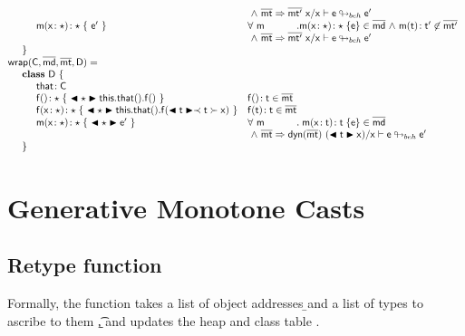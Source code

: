 \documentclass[a4paper,USenglish]{tex/lipics-v2016}
\begin{document}
\[\begin{array}{@{}ll@{}l@{}r@{~}c@{~}r}
&\multicolumn{5}{l}{~\wedge~\rtranst{\bmt}\bmtp\x\x{\e}{\ep}}
\\
\SPP \Mdef\m\x\any\any {~\ep~}
&    \All \m  \Mdef\m\x\any\any\e\in\b\md  &\wedge& \Mtype\m\t\tp\not\in\bmtp \\
&\multicolumn{5}{l}{~\wedge~\rtranst{\bmt}\bmtp\x\x{\e}{\ep}}
\\
\SP \}
\\
\wrapAny\C\bmd\bmt\D = \\
\SP \class~\D~\{\\
\SPP \Fdef \that \C\\ 
\SPP   \Mdefz\f\any{~\BehCast\any{\Get{{\Get\this\that}}\f}~}
&  \Mtype\f{}\t \in \bmt\\
\SPP   \Mdef\f\x\any\any{~\BehCast\any{\Set{\Get\this\that}\f{\bscast\t\x}}~}
&  \Mtype\f\t\t \in \bmt\\
\SPP   \Mdef\m\x\any\any {~\BehCast\any{{\ep}}~}
&  \All \m \Mdef\m\x\t\t\e\in\b\md \\
&\multicolumn{5}{l}{~\wedge~\rtranst{\bmt}{\dyn{\bmt}}{(\BehCast\t\x)}\x{\e}{\ep}}
\\
\SP \}\\
\end{array}\]


\normalsize

\section{Generative Monotone Casts}

\subsection{Retype function}\label{retype}

Formally, the  function takes a list of object
addresses \b\a and a list of types to ascribe to them \b\t, and updates the
heap \s and class table \K. 
\end{document}
